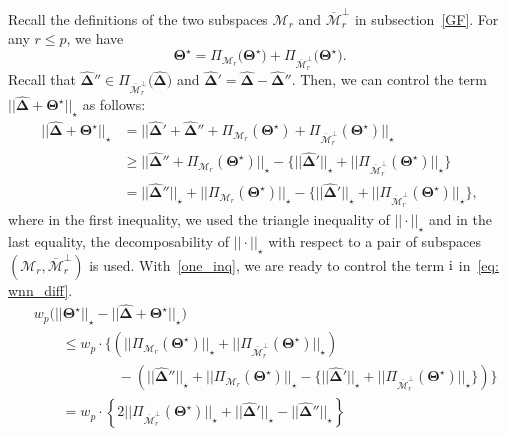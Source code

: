 \documentclass[alpha-refs]{wiley-article}
\newcommand{\RN}[1]{ \textup{\uppercase\expandafter{\romannumeral#1}} }
\begin{document}
\noindent
Recall the definitions of the two subspaces $\mathcal{M}_{r}$ and $\overline{\mathcal{M}}_{r}^{\perp}$ in subsection~\ref{GF}.
For any $r\leq p$, we have
\begin{equation} \label{star}
    \boldsymbol{\Theta^{\star}} = \Pi_{\mathcal{M}_{r}}\big(\boldsymbol{\Theta^{\star}}\big) +  \Pi_{\overline{\mathcal{M}}_{r}^{\perp}}\big(\boldsymbol{\Theta^{\star}}\big).
\end{equation}
Recall that $\boldsymbol{\widehat{\Delta}}'' \in \Pi_{\overline{\mathcal{M}}_{r}^{\perp}}\big(\boldsymbol{\widehat{\Delta}}\big)$ and
$\boldsymbol{\widehat{\Delta}}'=\boldsymbol{\widehat{\Delta}}-\boldsymbol{\widehat{\Delta}}''$.
Then, we can control the term $||\boldsymbol{\widehat{\Delta}} + \boldsymbol{\Theta^{\star}}||_{\star}$ as follows:
\begin{align}
    ||\boldsymbol{\widehat{\Delta}} + \boldsymbol{\Theta^{\star}}||_{\star} & =  ||\boldsymbol{\widehat{\Delta}}' + \boldsymbol{\widehat{\Delta}}'' + \Pi_{\mathcal{M}_{r}}(\boldsymbol{\Theta^{\star}}) + \Pi_{\overline{\mathcal{M}}_{r}^{\perp}}(\boldsymbol{\Theta^{\star}})||_{\star}\nonumber \\
    & \geq  ||\boldsymbol{\widehat{\Delta}}'' + \Pi_{\mathcal{M}_{r}}(\boldsymbol{\Theta^{\star}})||_{\star} - \{||\boldsymbol{\widehat{\Delta}}'||_{\star} + ||\Pi_{\overline{\mathcal{M}}_{r}^{\perp}}(\boldsymbol{\Theta^{\star}})||_{\star}\} \nonumber\\
    & =  ||\boldsymbol{\widehat{\Delta}}''||_{\star} + ||\Pi_{\mathcal{M}_{r}}(\boldsymbol{\Theta^{\star}})||_{\star} - \{||\boldsymbol{\widehat{\Delta}}'||_{\star} + ||\Pi_{\overline{\mathcal{M}}_{r}^{\perp}}(\boldsymbol{\Theta^{\star}})||_{\star}\} \label{one_inq},
\end{align}
where in the first inequality, we used the triangle inequality of $||\cdot||_{\star}$ and in the last equality, the decomposability of $||\cdot||_{\star}$ with respect to a pair of subspaces $(\mathcal{M}_{r},\overline{\mathcal{M}}_{r}^{\perp})$ is used.
With~\eqref{one_inq}, we are ready to control the term $\RN{1}$ in~\eqref{eq: wnn_diff}.
\begin{align}
    & w_{p}\Bigg( ||\boldsymbol{\Theta^{\star}}||_{\star} - ||\boldsymbol{\widehat{\Delta}} + \boldsymbol{\Theta^{\star}}||_{\star} \Bigg)
    \nonumber \\
    & \qquad \leq  w_{p} \cdot \Bigg\{ \left( ||\Pi_{\mathcal{M}_{r}}(\boldsymbol{\Theta^{\star}})||_{\star} + ||\Pi_{\overline{\mathcal{M}}_{r}^{\perp}}(\boldsymbol{\Theta^{\star}})||_{\star} \right) \nonumber \\
    & \qquad \qquad \qquad - \left(||\boldsymbol{\widehat{\Delta}}''||_{\star} + ||\Pi_{\mathcal{M}_{r}}(\boldsymbol{\Theta^{\star}})||_{\star} - \{||\boldsymbol{\widehat{\Delta}}'||_{\star} + ||\Pi_{\overline{\mathcal{M}}_{r}^{\perp}}(\boldsymbol{\Theta^{\star}})||_{\star}\} \right) \Bigg\} \nonumber \\
    & \qquad =  w_{p} \cdot \left\lbrace 2||\Pi_{\overline{\mathcal{M}}_{r}^{\perp}}(\boldsymbol{\Theta^{\star}})||_{\star} + ||\boldsymbol{\widehat{\Delta}}'||_{\star} - ||\boldsymbol{\widehat{\Delta}}''||_{\star} \right\rbrace \label{eq: wnn_diff_1}
\end{align}
\end{document}
